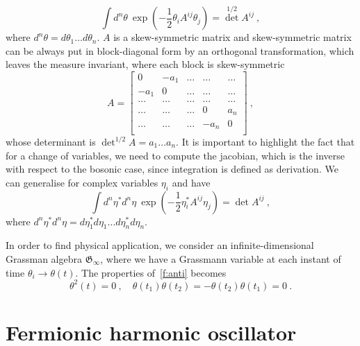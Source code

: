     \begin{equation*}
        \int d^n \theta ~ \exp(- \frac{1}{2} \theta_i A^{ij} \theta_j) = {\det}^{1/2} A^{ij} ~,
    \end{equation*}
    where $d^n \theta = d\theta_1 \ldots d\theta_n$. $A$ is a skew-symmetric matrix and skew-symmetric matrix can be always put in block-diagonal form by an orthogonal transformation, which leaves the measure invariant, where each block is skew-symmetric 
    \begin{equation*}
        A = \begin{bmatrix}
            0 & -a_1 & \ldots & \ldots & \ldots \\
            - a_1 & 0 & \ldots & \ldots & \ldots \\
            \ldots & \ldots & \ldots & \ldots & \ldots \\
            \ldots &  \ldots & \ldots & 0 & a_n \\
            \ldots &  \ldots & \ldots & - a_n & 0 \\
        \end{bmatrix} ~,
    \end{equation*}
    whose determinant is ${\det}^{1/2} A = a_1 \ldots a_n$. It is important to highlight the fact that for a change of variables, we need to compute the jacobian, which is the inverse with respect to the bosonic case, since integration is defined as derivation. We can generalise for complex variables $\eta_i$ and have 
    \begin{equation*}
        \int d^n \eta^* d^n \eta ~ \exp(- \frac{1}{2} \eta_i^* A^{ij} \eta_j) = \det A^{ij} ~,
    \end{equation*}
    where $d^n \eta^* d^n \eta = d \eta_1^* d \eta_1 \ldots d \eta_n^* d \eta_n$.

    In order to find physical application, we consider an infinite-dimensional Grassman algebra $\mathfrak G_\infty$, where we have a Grassmann variable at each instant of time $\theta_i \rightarrow \theta (t)$. The properties of~\eqref{f:anti} becomes 
    \begin{equation*}
        \theta^2 (t) = 0 ~, \quad \theta(t_1) \theta(t_2) = - \theta(t_2) \theta(t_1) = 0 ~.
    \end{equation*}

\section{Fermionic harmonic oscillator}

